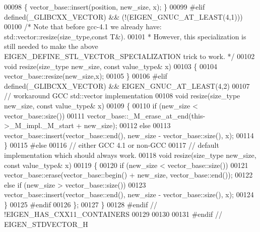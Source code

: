 \begin{DoxyCode}
00098   \{ vector\_base::insert(position, new\_size, x); \}
00099 \textcolor{preprocessor}{#elif defined(\_GLIBCXX\_VECTOR) && (!(EIGEN\_GNUC\_AT\_LEAST(4,1)))}
00100   \textcolor{comment}{/* Note that before gcc-4.1 we already have: std::vector::resize(size\_type,const T&).}
00101 \textcolor{comment}{   * However, this specialization is still needed to make the above EIGEN\_DEFINE\_STL\_VECTOR\_SPECIALIZATION
       trick to work. */}
00102   \textcolor{keywordtype}{void} resize(size\_type new\_size, \textcolor{keyword}{const} value\_type& x)
00103   \{
00104     vector\_base::resize(new\_size,x);
00105   \}
00106 \textcolor{preprocessor}{#elif defined(\_GLIBCXX\_VECTOR) && EIGEN\_GNUC\_AT\_LEAST(4,2)}
00107   \textcolor{comment}{// workaround GCC std::vector implementation}
00108   \textcolor{keywordtype}{void} resize(size\_type new\_size, \textcolor{keyword}{const} value\_type& x)
00109   \{
00110     \textcolor{keywordflow}{if} (new\_size < vector\_base::size())
00111       vector\_base::\_M\_erase\_at\_end(this->\_M\_impl.\_M\_start + new\_size);
00112     \textcolor{keywordflow}{else}
00113       vector\_base::insert(vector\_base::end(), new\_size - vector\_base::size(), x);
00114   \}
00115 \textcolor{preprocessor}{#else}
00116   \textcolor{comment}{// either GCC 4.1 or non-GCC}
00117   \textcolor{comment}{// default implementation which should always work.}
00118   \textcolor{keywordtype}{void} resize(size\_type new\_size, \textcolor{keyword}{const} value\_type& x)
00119   \{
00120     \textcolor{keywordflow}{if} (new\_size < vector\_base::size())
00121       vector\_base::erase(vector\_base::begin() + new\_size, vector\_base::end());
00122     \textcolor{keywordflow}{else} \textcolor{keywordflow}{if} (new\_size > vector\_base::size())
00123       vector\_base::insert(vector\_base::end(), new\_size - vector\_base::size(), x);
00124   \}
00125 \textcolor{preprocessor}{#endif}
00126   \};
00127 \}
00128 \textcolor{preprocessor}{#endif // !EIGEN\_HAS\_CXX11\_CONTAINERS}
00129 
00130 
00131 \textcolor{preprocessor}{#endif // EIGEN\_STDVECTOR\_H}
\end{DoxyCode}
